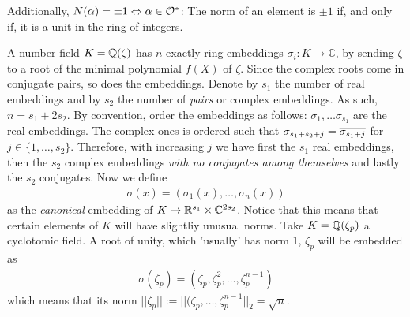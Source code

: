     Additionally, \(N(\alpha) = \pm 1 \Leftrightarrow \alpha\in\mathcal{O}^*\): The norm of an element is \(\pm1\) if, and only if, it is a unit in the ring of integers.\par
    \cite{First R-LWE}A number field \(K = \mathbb{Q}(\zeta)\) has \(n\) exactly ring embeddings \(\sigma_i : K\rightarrow \mathbb{C}\), by sending \(\zeta\) to a root of the minimal polynomial \(f(X)\) of \(\zeta\). Since the complex roots come in conjugate pairs, so does the embeddings. Denote by \(s_1\) the number of real embeddings and by \(s_2\) the number of \emph{pairs} or complex embeddings. As such, \(n = s_1 + 2s_2\). By convention, order the embeddings as follows: \(\sigma_1, \dots \sigma_{s_1}\) are the real embeddings. The complex ones is ordered such that \(\sigma_{s_1 + s_2 + j} = \overline{\sigma_{s_1 + j}}\) for \(j\in\{1,\dots ,s_2\}\). Therefore, with increasing \(j\) we have first the \(s_1\) real embeddings, then the \(s_2\) complex embeddings \emph{with no conjugates among themselves} and lastly the \(s_2\) conjugates. Now we define
    \begin{align*}
        \sigma(x) = (\sigma_1(x), \dots , \sigma_{n}(x))
    \end{align*}
     as the \emph{canonical} embedding of \(K\mapsto \mathbb{R}^{s_1}\times \mathbb{C}^{2s_2}\). Notice that this means that certain elements of \(K\) will have slightliy unusual norms. Take \(K = \mathbb{Q}(\zeta_p)\) a cyclotomic field. A root of unity, which 'usually' has norm 1, \(\zeta_p\) will be embedded as
     \begin{align*}
         \sigma(\zeta_p) = (\zeta_p, \zeta_p^2, \dots , \zeta_p^{n-1})
     \end{align*}
     which means that its norm \(||\zeta_p|| := ||(\zeta_p, \dots ,\zeta_p^{n-1}||_2 = \sqrt{n}\).
